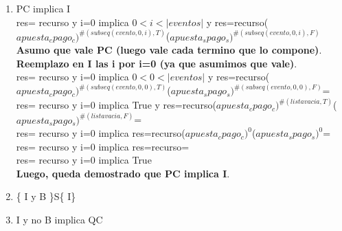\documentclass[10pt,a4paper]{article}
\begin{document}
\begin{flushleft}
\begin{enumerate} \setlength\itemsep{0cm}
	\item PC implica I\\
	res= recurso y i=0 implica $0<i<|eventos|$ y res=recurso($apuesta_cpago_c)^{\#(subseq(evento,0,i),T)}$($apuesta_spago_s)^{\#(subseq(evento,0,i),F)}$\\
	\vspace{2mm}
	\textbf{Asumo que vale PC (luego vale cada termino que lo compone)}.\\
	\vspace{2mm}
	\textbf{Reemplazo en I las i por i=0 (ya que asumimos que vale)}.\\
	\vspace{2mm}
	res= recurso y i=0 implica $0<0<|eventos|$ y res=recurso($apuesta_cpago_c)^{\#(subseq(evento,0,0),T)}$($apuesta_spago_s)^{\#(subseq(evento,0,0),F)}$=\\
	\vspace{2mm}
	res= recurso y i=0 implica True y res=recurso($apuesta_cpago_c)^{\#(lista vacia,T)}$($apuesta_spago_s)^{\#(lista vacia,F)}$=\\
	\vspace{2mm}
	res= recurso y i=0 implica res=recurso($apuesta_cpago_c)^{0}$($apuesta_spago_s)^{0}$=\\
	\vspace{2mm}
	res= recurso y i=0 implica res=recurso=\\
	\vspace{2mm}
	res= recurso y i=0 implica True \\
	\vspace{2mm}
	\textbf{Luego, queda demostrado que PC implica I}.
	\item \{ I y B \}S\{ I\}\\
	\item I y no B implica QC\\


\end{enumerate}

\end{flushleft}
\end{document}
